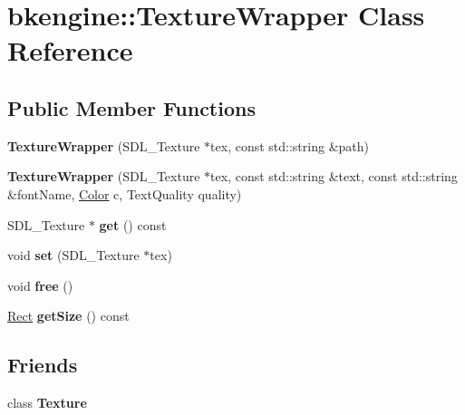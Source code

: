 \hypertarget{classbkengine_1_1TextureWrapper}{}\section{bkengine\+:\+:Texture\+Wrapper Class Reference}
\label{classbkengine_1_1TextureWrapper}
\subsection*{Public Member Functions}
\begin{DoxyCompactItemize}
\item 
\mbox{\label{classbkengine_1_1TextureWrapper_aa33c372bc5b664f584884525ca0d09fa}} 
{\bfseries Texture\+Wrapper} (S\+D\+L\+\_\+\+Texture $\ast$tex, const std\+::string \&path)
\item 
\mbox{\label{classbkengine_1_1TextureWrapper_a8c71398da302ff4fdb21c631f8ba7fbe}} 
{\bfseries Texture\+Wrapper} (S\+D\+L\+\_\+\+Texture $\ast$tex, const std\+::string \&text, const std\+::string \&font\+Name, \hyperlink{structbkengine_1_1Color}{Color} c, Text\+Quality quality)
\item 
\mbox{\label{classbkengine_1_1TextureWrapper_ab6682dd9e08515e7ae7cf9c6315952ab}} 
S\+D\+L\+\_\+\+Texture $\ast$ {\bfseries get} () const
\item 
\mbox{\label{classbkengine_1_1TextureWrapper_a92879535f9315c64449f075e8e9eb24d}} 
void {\bfseries set} (S\+D\+L\+\_\+\+Texture $\ast$tex)
\item 
\mbox{\label{classbkengine_1_1TextureWrapper_aaf2f6ae04d38d6f855753521ea299547}} 
void {\bfseries free} ()
\item 
\mbox{\label{classbkengine_1_1TextureWrapper_aa349172b01bf01501c1454f8bb6f88a6}} 
\hyperlink{structbkengine_1_1Rect}{Rect} {\bfseries get\+Size} () const
\end{DoxyCompactItemize}
\subsection*{Friends}
\begin{DoxyCompactItemize}
\item 
\mbox{\label{classbkengine_1_1TextureWrapper_af7f909106d08e36cd50aa58e36f9bf47}} 
class {\bfseries Texture}
\end{DoxyCompactItemize}


